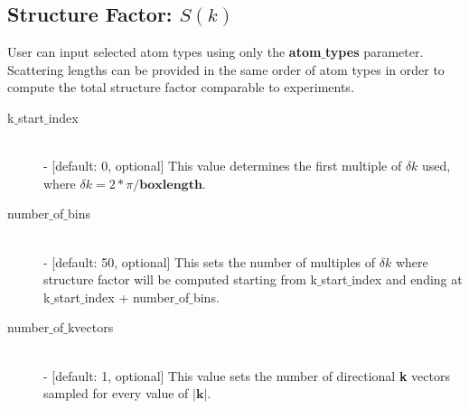\documentclass{article}
\begin{document}
\subsection{Structure Factor: $S(k)$} \label{sec::sofk_parm}
User can input selected atom types using only the \textbf{atom$\_$types} parameter.  Scattering lengths can be provided in the same order of atom types in order to compute the total structure factor comparable to experiments.
\begin{description}		
	\item[k$\_$start$\_$index] \hfill \\
	- [default: 0, optional] This value determines the first multiple of $\delta k$ used, where $\delta k = 2*\pi/\textbf{boxlength}$.  
		
	\item[number$\_$of$\_$bins] \hfill \\
	- [default: 50, optional] This sets the number of multiples of $\delta k$ where structure factor will be computed starting from k$\_$start$\_$index and ending at k$\_$start$\_$index + number$\_$of$\_$bins. 
	
	\item[number$\_$of$\_$kvectors] \hfill \\
	- [default: 1, optional] This value sets the number of directional \textbf{k} vectors sampled for every value of $|\bm{k}|$.  

\end{description}
\end{document}
